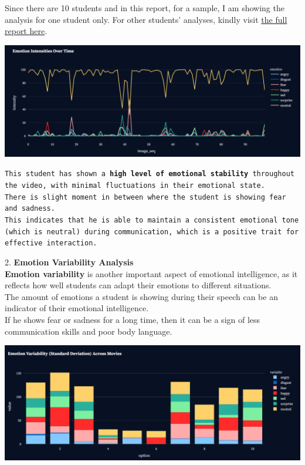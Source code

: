 \documentclass{article}
\begin{document}
\begin{tcolorbox}[colback=yellow!10!white, colframe=red!80!black, title=Warning]
Since there are 10 students and in this report, for a sample, I am showing the analysis for one student only. For other students' analyses, kindly visit \href{https://eda-analysis-iby-0.streamlit.app/}{the full report here}.
\end{tcolorbox}

\begin{center}
    \includegraphics[width=1\columnwidth]{images/emotion_intensity_over_time.png}
\end{center}

\texttt{This student has shown a \textbf{high level of emotional stability} throughout the video, with minimal fluctuations in their emotional state.\\

There is slight moment in between where the student is showing fear and sadness.\\

This indicates that he is able to maintain a consistent emotional tone (which is neutral) during communication, which is a positive trait for effective interaction.\\
}
\normalfont

2. \textbf{Emotion Variability Analysis}\\

\textbf{Emotion variability} is another important aspect of emotional intelligence, as it reflects how well students can adapt their emotions to different situations.\\

The amount of emotions a student is showing during their speech can be an indicator of their emotional intelligence.\\

If he shows fear or sadness for a long time, then it can be a sign of less communication skills and poor body language.\\
\begin{center}
    \includegraphics[width=1\columnwidth]{images/emotion_variablity.png}
\end{center}
\end{document}
